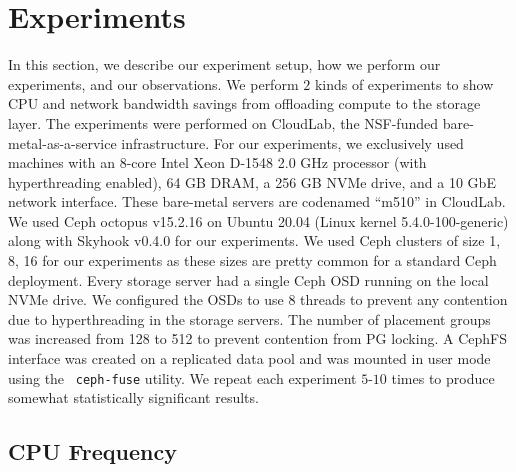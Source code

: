 \documentclass[11pt]{article}
\newcommand{\code}[1]{\colorbox{light-gray}{\texttt{#1}}}
\begin{document}
\section{Experiments}
\label{sec:experiments}
In this section, we describe our experiment setup, how we perform our experiments, and our observations. We perform $2$ kinds of experiments to show CPU and network bandwidth savings from offloading compute to the storage layer. The experiments were performed on CloudLab, the NSF-funded bare-metal-as-a-service infrastructure. For our
experiments, we exclusively used machines with an 8-core
Intel Xeon D-1548 2.0 GHz processor (with hyperthreading
enabled), 64 GB DRAM, a 256 GB NVMe drive, and a 10 GbE
network interface. These bare-metal servers are codenamed
“m510” in CloudLab. We used Ceph octopus v15.2.16 on Ubuntu 20.04 (Linux kernel 5.4.0-100-generic) along with Skyhook v0.4.0 for our experiments. We used Ceph clusters of size 1, 8, 16 for our experiments as these sizes are pretty common for a standard Ceph deployment. Every storage server had a single Ceph OSD running on the local NVMe drive. We configured the OSDs to use 8 threads to prevent any contention due to hyperthreading in the storage servers. The number of placement groups was increased from 128 to 512 to prevent contention from PG locking. A CephFS interface was created on a replicated data pool and was mounted in user mode using the ~\code{ceph-fuse} utility. We repeat each experiment $5$-$10$ times to produce somewhat statistically significant results. 
\subsection{CPU Frequency}
\end{document}
